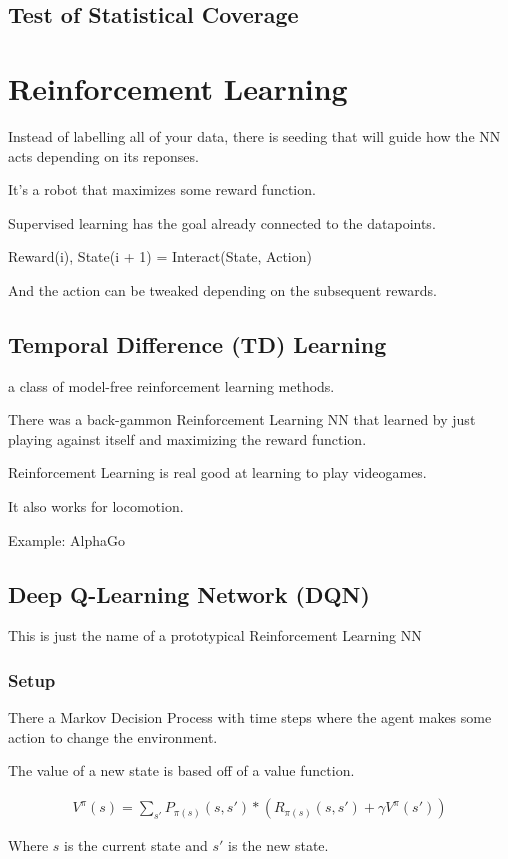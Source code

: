 \documentclass[fleqn]{report}
\newcommand{\equations} [1] {
\begin{gather*}
#1
\end{gather*}
}
\begin{document}
\section{Test of Statistical Coverage}


\chapter{Reinforcement Learning}
Instead of labelling all of your data, there is seeding that will guide 
how the NN acts depending on its reponses. 

It's a robot that maximizes some reward function. 

Supervised learning has the goal already connected to the datapoints. 

Reward(i), State(i + 1)
=
Interact(State, Action)

And the action can be tweaked depending on the subsequent rewards. 

\section{Temporal Difference (TD) Learning}
a class of model-free reinforcement learning methods.

There was a back-gammon Reinforcement Learning NN that learned by just 
playing against itself and maximizing the reward function. 

Reinforcement Learning is real good at learning to play videogames. 

It also works for locomotion. 

Example: AlphaGo 

\section{Deep Q-Learning Network (DQN)}
This is just the name of a prototypical Reinforcement Learning NN 

\subsection{Setup}
There a Markov Decision Process 
with time steps where the agent makes some action to change the environment.

The value of a new state is based off of a value function. 

\equations{
    V^{\pi}(s)
    =
    \sum_{s'}
    P_{\pi(s)}(s, s')
    *
    (
    R_{\pi(s)}(s, s')
    +
    \gamma V^{\pi}(s')
    )
}
Where $s$ is the current state and $s'$ is the new state. 
\end{document}

